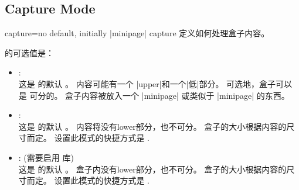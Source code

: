   {\tcbuselistingtext}
  

  
\subsection{Capture Mode}\label{subsec:capture}

\begin{docTcbKey}{capture}{=}{no default, initially |minipage|}
capture  定义如何处理盒子内容。

  

 的可选值是：
\begin{itemize}
\item{}:\\
这是  的默认  。%
内容可能有一个 |upper|和一个|低|部分。%
可选地，盒子可以是  可分的。
盒子内容被放入一个 |minipage| 或类似于 |minipage| 的东西。
\item{}:\\
这是  的默认  。%
内容将没有lower部分，也不可分。%
盒子的大小根据内容的尺寸而定。%
设置此模式的快捷方式是 .
\item{}:%
 (需要启用  库)\\
这是  的默认 。 %
盒子内没有lower部分，也不可分。
盒子的大小根据内容的尺寸而定。%
设置此模式的快捷方式是 .
\end{itemize}


\end{docTcbKey}
